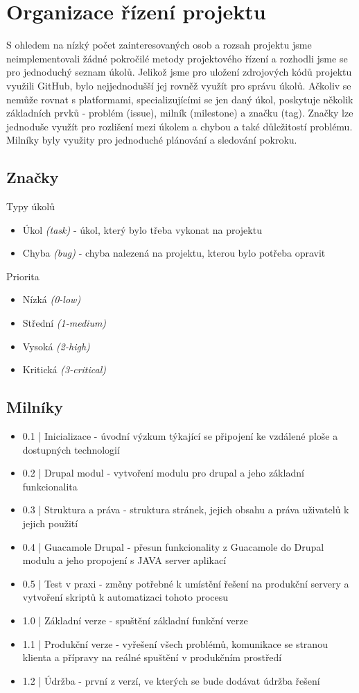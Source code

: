 \section{Organizace řízení projektu}
S ohledem na nízký počet zainteresovaných osob a rozsah projektu jsme neimplementovali žádné pokročilé metody projektového řízení a rozhodli jsme se pro jednoduchý seznam úkolů. Jelikož jsme pro uložení zdrojových kódů projektu využili GitHub, bylo nejjednodušší jej rovněž využít pro správu úkolů. Ačkoliv se nemůže rovnat s platformami, specializujícími se jen daný úkol, poskytuje několik základních prvků - problém (issue), milník (milestone) a značku (tag). Značky lze jednoduše využít pro rozlišení mezi úkolem a chybou a také důležitostí problému. Milníky byly využity pro jednoduché plánování a sledování pokroku.

\subsection{Značky}
Typy úkolů
\begin{itemize}
  \item Úkol \emph{(task)} - úkol, který bylo třeba vykonat na projektu
  \item Chyba \emph{(bug)} - chyba nalezená na projektu, kterou bylo potřeba opravit
\end{itemize}
Priorita
\begin{itemize}
	\item Nízká \emph{(0-low)}
	\item Střední \emph{(1-medium)}
	\item Vysoká  \emph{(2-high)}
	\item Kritická \emph{(3-critical)}
\end{itemize}

\subsection{Milníky}
\begin{itemize}
  \item 0.1 | Inicializace - úvodní výzkum týkající se připojení ke vzdálené ploše a dostupných technologií
  \item 0.2 | Drupal modul - vytvoření modulu pro drupal a jeho základní funkcionalita
  \item 0.3 | Struktura a práva - struktura stránek, jejich obsahu a práva uživatelů k jejich použití
  \item 0.4 | Guacamole Drupal - přesun funkcionality z Guacamole do Drupal modulu a jeho propojení s JAVA server aplikací
  \item 0.5 | Test v praxi - změny potřebné k umístění řešení na produkční servery a vytvoření skriptů k automatizaci tohoto procesu
  \item 1.0 | Základní verze - spuštění základní funkční verze
  \item 1.1 | Produkční verze - vyřešení všech problémů, komunikace se stranou klienta a přípravy na reálné spuštění v produkčním prostředí
  \item 1.2 | Údržba - první z verzí, ve kterých se bude dodávat údržba řešení
\end{itemize}
